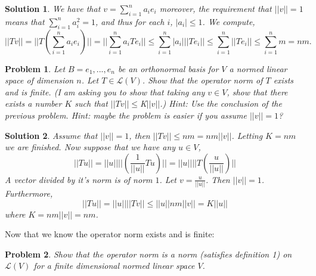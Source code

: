 \documentclass{article}
\theoremstyle{problemstyle}
\newtheorem{problem}{Problem}
\theoremstyle{problemstyle}
\newtheorem{solution}{Solution}
\theoremstyle{problemstyle}
\theoremstyle{problemstyle}
\begin{document}
\begin{solution}
We have that $v = \sum_{i=1}^na_ie_i$ moreover, the requirement that $||v|| = 1$ means that $\sum_{i=1}^na_i^2 = 1$, and thus for each $i$, $|a_i| \leq 1$.   We compute, 
\begin{equation}
||Tv|| = ||T(\sum_{i = 1}^na_ie_i)|| = ||\sum_{i = 1}^na_iTe_i|| \leq \sum_{i = 1}^n|a_i|||Te_i|| \leq \sum_{i = 1}^n||Te_i|| \leq \sum_{i = 1}^nm = nm.
\end{equation}
\end{solution}

\begin{problem}
Let $B = e_1,...,e_n$ be an orthonormal basis for $V$ a normed linear space of dimension $n$. Let $T \in \mathscr{L}(V)$. Show that the operator norm of $T$ exists and is finite. (I am asking you to show that taking any $v \in V$, show that there exists a number $K$ such that $||Tv|| \leq $K$||v||$.) Hint: Use the conclusion of the previous problem. Hint: maybe the problem is easier if you assume $||v|| = 1$? 
\end{problem}

\begin{solution}
Assume that $||v|| = 1$, then $||Tv|| \leq nm = nm||v||$. Letting $K=nm$ we are finished. Now suppose that we have any $u \in V$,  
\begin{equation*}
||Tu|| = ||u||||(\frac{1}{||u||}Tu)|| = ||u||||T(\frac{u}{||u||})||
\end{equation*}
A vector divided by it's norm is of norm $1$. Let $v = \frac{u}{||u||}$. Then $||v|| = 1$. Furthermore, 
\begin{equation*}
||Tu|| = ||u||||Tv|| \leq ||u||nm||v|| = K||u|| 
\end{equation*}
where $K = nm||v|| = nm$. 
\end{solution}

Now that we know the operator norm exists and is finite:

\begin{problem}
Show that the operator norm is a norm (satisfies definition 1) on $\mathscr{L}(V)$ for a finite dimensional normed linear space $V$.  
\end{problem}
\end{document}
